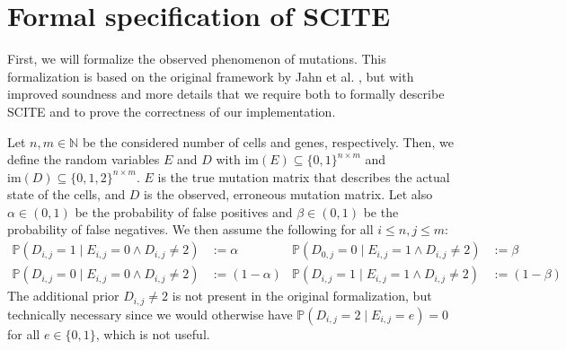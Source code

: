 \section{Formal specification of SCITE}

First, we will formalize the observed phenomenon of mutations. This formalization is based on the original framework by Jahn et al. \cite{tree2016}, but with improved soundness and more details that we require both to formally describe \ac{SCITE} and to prove the correctness of our implementation. 

\begin{definition}
    \label{def:mutmatrix}
    Let $n, m \in \mathbb{N}$ be the considered number of cells and genes, respectively. Then, we define the random variables $E$ and $D$ with $\mathrm{im}(E) \subseteq \{0,1\}^{n \times m}$ and $\mathrm{im}(D) \subseteq \{0, 1, 2\}^{n \times m}$. $E$ is the true mutation matrix that describes the actual state of the cells, and $D$ is the observed, erroneous mutation matrix. Let also $\alpha \in (0,1)$ be the probability of false positives and $\beta \in (0,1)$ be the probability of false negatives. We then assume the following for all $i \leq n, j \leq m$:
    \begin{align*}
        \mathbb{P}(D_{i,j} = 1 \mid E_{i,j} = 0 \wedge D_{i,j} \neq 2) &:= \alpha & \mathbb{P}(D_{0,j} = 0\mid E_{i,j} = 1 \wedge D_{i,j} \neq 2) &:= \beta \\
        \mathbb{P}(D_{i,j} = 0 \mid E_{i,j} = 0 \wedge D_{i,j} \neq 2) &:= (1-\alpha) & \mathbb{P}(D_{i,j} = 1 \mid E_{i,j} = 1 \wedge D_{i,j} \neq 2) &:= (1-\beta)
    \end{align*}
    The additional prior $D_{i,j} \neq 2$ is not present in the original formalization, but technically necessary since we would otherwise have $\mathbb{P}(D_{i,j} = 2 \mid E_{i,j} = e) = 0$ for all $e \in \{0,1\}$, which is not useful.
\end{definition}

